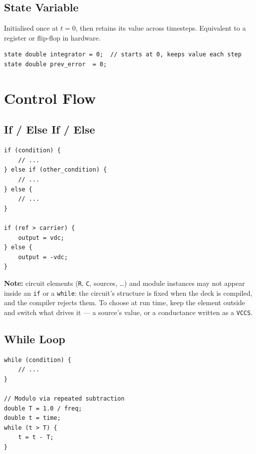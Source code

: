 \documentclass[11pt, a4paper]{article}
\newcommand{\code}[1]{\texttt{\small #1}}
\begin{document}
\subsection{State Variable}

Initialised once at \(t = 0\), then retains its value across timesteps.
Equivalent to a register or flip-flop in hardware.

\begin{lstlisting}
state double integrator = 0;  // starts at 0, keeps value each step
state double prev_error  = 0;
\end{lstlisting}

\section{Control Flow}

\subsection{If / Else If / Else}

\begin{lstlisting}
if (condition) {
    // ...
} else if (other_condition) {
    // ...
} else {
    // ...
}

if (ref > carrier) {
    output = vdc;
} else {
    output = -vdc;
}
\end{lstlisting}

\textbf{Note:} circuit elements (\code{R}, \code{C}, sources, \ldots) and module
instances may not appear inside an \code{if} or a \code{while}: the circuit's
structure is fixed when the deck is compiled, and the compiler rejects them.
To choose at run time, keep the element outside and switch what drives it ---
a source's value, or a conductance written as a \code{VCCS}.

\subsection{While Loop}

\begin{lstlisting}
while (condition) {
    // ...
}

// Modulo via repeated subtraction
double T = 1.0 / freq;
double t = time;
while (t > T) {
    t = t - T;
}
\end{lstlisting}

\end{document}
